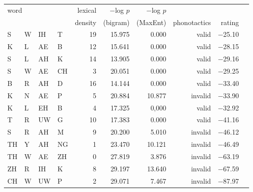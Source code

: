 \begin{longtable}{l@{ } l@{ } l@{ } l r r r r r r} 
\toprule
\multicolumn{4}{l}{\multirow{2}{*}{word}} & lexical & $-$log $p$ & $-$log $p$ \\
&&&& density & (bigram) & (MaxEnt) & phonotactics & rating \\
\midrule
S & W & IH & T   & 19 &  15.975 & 0.000  & valid & $-$25.10 \\
K & L & AE & B   & 12 &  15.641 & 0.000  & valid & $-$28.15 \\
S & L & AH & K   & 14 &  13.905 & 0.000  & valid & $-$29.16 \\
S & W & AE & CH  &  3 &  20.051 & 0.000  & valid & $-$29.25 \\
B & R & AH & D   & 16 &  14.144 & 0.000  & valid & $-$33.40 \\
K & N & AE & P   &  5 &  20.884 & 10.877 & invalid & $-$33.90 \\
K & L & EH & B   &  4 &  17.325 & 0,000  & valid & $-$32.92 \\
T & R & UW & G   & 10 &  17.383 & 0.000  & valid & $-$41.16 \\
S & R & AH & M   &  9 &  20.200 & 5.010  & invalid & $-$46.12 \\
TH & Y & AH & NG &  1 &  23.470 & 10.121 & invalid & $-$46.49 \\
TH & W & AE & ZH &  0 &  27.819 & 3.876  & invalid & $-$63.19 \\
ZH & R & IH & K  &  8 &  29.197 & 13.640 & invalid & $-$67.59 \\
CH & W & UW & P  &  2 &  29.071 & 7.467  & invalid & $-$87.97 \\
\bottomrule 
\end{longtable} 


